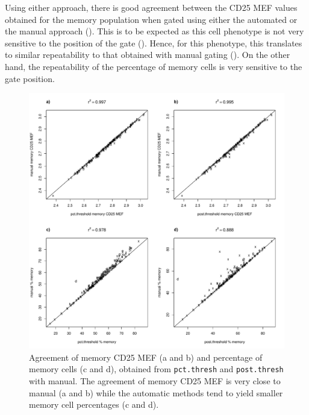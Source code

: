 Using either approach, there is good agreement between the CD25 MEF values obtained for the memory population when gated using either the automated
or the manual approach ().
This is to be expected as this cell phenotype is not very sensitive to the position of the  gate
().  
Hence, for this phenotype, this translates to similar repeatability to that obtained with manual gating ().
On the other hand, the repeatability of the percentage of memory cells is very sensitive to the gate position.


\begin{figure}[h]
 \centering
 \includegraphics[scale=.6]{figures/memory-auto-manual-agreement-thresholds.pdf}
 {Agreement of memory CD25 MEF (a and b) and percentage of memory cells (c and d), obtained from \texttt{pct.thresh} and \texttt{post.thresh} with manual.}
 {
   The agreement of memory CD25 MEF is very close to manual (a and b) while the automatic methods tend to yield smaller memory cell percentages (c and d).
 }
\end{figure} 

